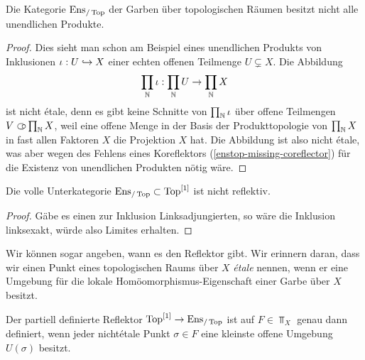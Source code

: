 \begin{prop} \label{enstop-not-complete}
  Die Kategorie $\operatorname{Ens}_{/\operatorname{Top}}$ der Garben über topologischen Räumen besitzt
  nicht alle unendlichen Produkte.
\end{prop}
\begin{proof}
  Dies sieht man schon am Beispiel eines unendlichen Produkts von
  Inklusionen $\iota: U \hookrightarrow X$ einer echten offenen Teilmenge $U
  \subsetneq X$. Die Abbildung
  \[ \prod_{\mathbb{N}} \iota: \prod_{\mathbb{N}} U \to \prod_{\mathbb{N}} X \]
  ist nicht étale, denn es gibt keine Schnitte von $\prod_{\mathbb{N}} \iota$
  über offene Teilmengen $V \subset\kern-0.58em\circ \prod_{\mathbb{N}} X$, weil eine offene
  Menge in der Basis der Produkttopologie von $\prod_{\mathbb{N}} X$ in fast
  allen Faktoren $X$ die Projektion $X$ hat. Die Abbildung ist also
  nicht étale, was aber wegen des Fehlens eines Koreflektors
  (\ref{enstop-missing-coreflector}) für die Existenz von unendlichen
  Produkten nötig wäre.
\end{proof}
\begin{kor} \label{enstop-not-reflective}
  Die volle Unterkategorie $\operatorname{Ens}_{/\operatorname{Top}} \subset \operatorname{Top}^{[1]}$ ist nicht
  reflektiv.
\end{kor}
\begin{proof}
  Gäbe es einen zur Inklusion Linksadjungierten, so wäre die Inklusion
  linksexakt, würde also Limites erhalten.
\end{proof}
Wir können sogar angeben, wann es den Reflektor gibt. Wir erinnern
daran, dass wir einen Punkt eines topologischen Raums über $X$
\emph{étale} nennen, wenn er eine Umgebung für die lokale
Homöomorphismus-Eigenschaft einer Garbe über $X$ besitzt.
\begin{prop}
  Der partiell definierte Reflektor $\operatorname{Top}^{[1]} \to \operatorname{Ens}_{/\operatorname{Top}}$ ist auf
  $F \in \Top_X$ genau dann definiert, wenn jeder nichtétale Punkt
  $\sigma \in F$ eine kleinste offene Umgebung $U(\sigma)$ besitzt.
\end{prop}
